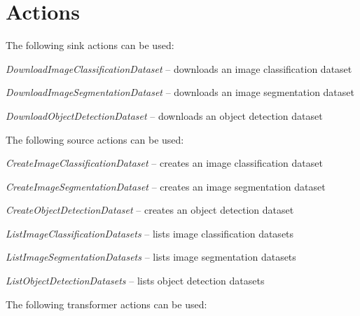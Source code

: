 \documentclass[a4paper]{book}
\begin{document}
\section{Actions}
The following sink actions can be used:
\begin{tight_itemize}
  \item \textit{DownloadImageClassificationDataset} -- downloads an image classification dataset
  \item \textit{DownloadImageSegmentationDataset} -- downloads an image segmentation dataset
  \item \textit{DownloadObjectDetectionDataset} -- downloads an object detection dataset
\end{tight_itemize}
The following source actions can be used:
\begin{tight_itemize}
  \item \textit{CreateImageClassificationDataset} -- creates an image classification dataset
  \item \textit{CreateImageSegmentationDataset} -- creates an image segmentation dataset
  \item \textit{CreateObjectDetectionDataset} -- creates an object detection dataset
  \item \textit{ListImageClassificationDatasets} -- lists image classification datasets
  \item \textit{ListImageSegmentationDatasets} -- lists image segmentation datasets
  \item \textit{ListObjectDetectionDatasets} -- lists object detection datasets
\end{tight_itemize}
The following transformer actions can be used:
\end{document}
